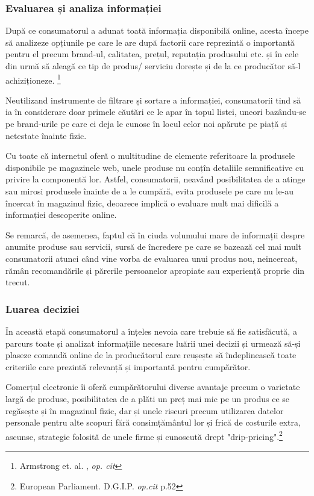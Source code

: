 \documentclass[a4paper, 12pt]{article}
\begin{document}
		\subsubsection{Evaluarea și analiza informației }
		
		\quad\quad\space După ce consumatorul a adunat toată informația disponibilă online, acesta începe să analizeze opțiunile pe care le are după factorii care reprezintă o importantă pentru el precum brand-ul, calitatea, prețul, reputația produsului etc. și în cele din urmă să aleagă ce tip de produs/ serviciu dorește și de la ce producător să-l achiziționeze. \footnote{Armstrong et. al. , \textit{op. cit}}
		
		\quad Neutilizand instrumente de filtrare și sortare a informației, consumatorii tind să ia în considerare doar primele căutări ce le apar în topul listei, uneori bazându-se pe brand-urile pe care ei deja le cunosc în locul celor noi apărute pe piață și netestate înainte fizic.
		
		\quad Cu toate că internetul oferă o multitudine de elemente referitoare la produsele disponibile pe magazinele web, unele produse nu conțîn detaliile semnificative cu privire la componentă lor. Astfel, consumatorii, neavând posibilitatea de a atinge sau mirosi produsele înainte de a le cumpără, evita produsele pe care nu le-au încercat în magazinul fizic, deoarece implică o evaluare mult mai dificilă a informației descoperite online.
		
		\quad Se remarcă, de asemenea, faptul că în ciuda volumului mare de informații despre anumite produse sau servicii, sursă de încredere pe care se bazează cel mai mult consumatorii atunci când vine vorba de evaluarea unui produs nou, neincercat, rămân recomandările și părerile persoanelor apropiate sau experiență proprie din trecut.
		
		
		\subsubsection{Luarea deciziei}
		
		\quad\quad În această etapă consumatorul a înțeles nevoia care trebuie să fie satisfăcută, a parcurs toate și analizat informațiile necesare luării unei decizii și urmează să-și plaseze comandă online de la producătorul care reușește să îndeplinească toate criteriile care prezintă relevanță și importantă pentru cumpărător.
		
		\quad  Comerțul electronic îi oferă cumpărătorului diverse avantaje precum o varietate largă de produse, posibilitatea de a plăti un preț mai mic pe un produs ce se regăsește și în magazinul fizic, dar și unele riscuri precum utilizarea datelor personale pentru alte scopuri  fără consimțământul lor și frică de costurile extra, ascunse, strategie folosită de unele firme și cunoscută drept "drip-pricing".\footnote{European Parliament. D.G.I.P. \textit{op.cit} p.52}
		
\end{document}
